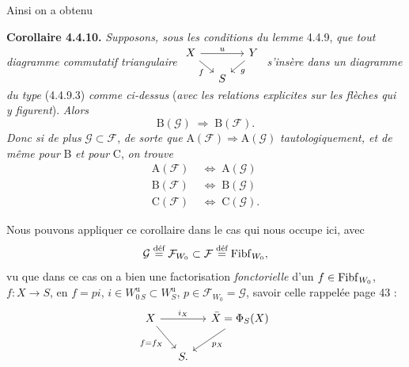 Ainsi on a obtenu

\textbf{Corollaire 4.4.10.} \textit{Supposons, sous les conditions du lemme} 4.4.9, \textit{que tout diagramme commutatif triangulaire} $\begin{tikzcd}[column sep=small, row sep=small, ampersand replacement=\&]
X \arrow[rr, "u"] \arrow[dr, "f"'] \& \& Y \arrow[dl, "g"] \\
\& S \&
\end{tikzcd}$ \textit{s'insère dans un diagramme du type} (4.4.9.3) \textit{comme ci-dessus} (\textit{avec les relations explicites sur les flèches qui y figurent}). \textit{Alors}
\[
\mathrm{B}(\mathcal{G}) \;\Longrightarrow\; \mathrm{B}(\mathcal{F}).
\]
\textit{Donc si de plus} $\mathcal{G} \subset \mathcal{F}$, \textit{de sorte que} $\mathrm{A}(\mathcal{F}) \Longrightarrow \mathrm{A}(\mathcal{G})$ \textit{tautologiquement, et de même pour} B \textit{et pour} C, \textit{on trouve}
\[
\begin{aligned}
\mathrm{A}(\mathcal{F}) &\;\Longleftrightarrow\; \mathrm{A}(\mathcal{G})\\
\mathrm{B}(\mathcal{F}) &\;\Longleftrightarrow\; \mathrm{B}(\mathcal{G})\\
\mathrm{C}(\mathcal{F}) &\;\Longleftrightarrow\; \mathrm{C}(\mathcal{G}).
\end{aligned}
\]

Nous pouvons appliquer ce corollaire dans le cas qui nous occupe ici, avec
\[
\mathcal{G} \overset{\text{déf}}{=} \mathcal{F}_{W_0} \subset \mathcal{F} \overset{\text{déf}}{=} \mathrm{Fibf}_{W_0},
\]
vu que dans ce cas on a bien une factorisation \textit{fonctorielle} d'un $f \in \mathrm{Fibf}_{W_0}$, $f : X \longrightarrow S$, en $f = pi$, $i \in W^{\mathrm{u}}_{0\,S} \subset W^{\mathrm{u}}_S$, $p \in \mathcal{F}_{W_0} = \mathcal{G}$, savoir celle rappelée page 43 :
\[
\begin{tikzcd}[column sep=small]
X \arrow[rr, "i_X"] \arrow[dr, "f=f_X"'] & & \bar{X} = \Phi_S(X) \arrow[dl, "p_X"] \\
& S. &
\end{tikzcd}
\]

